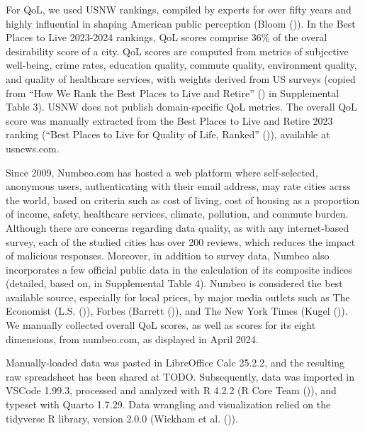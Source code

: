 \documentclass[
  english,
  12pt,
  a4paper,
]{scrartcl}
\begin{document}
For QoL, we used USNW rankings, compiled by experts for over fifty years
and highly influential in shaping American public perception (Bloom
()). In the Best Places to
Live 2023-2024 rankings, QoL scores comprise 36\% of the overal
desirability score of a city. QoL scores are computed from metrics of
subjective well-being, crime rates, education quality, commute quality,
environment quality, and quality of healthcare services, with weights
derived from US surveys (copied from {``How We Rank the {Best Places to
Live and Retire}''} () in Supplemental
Table 3). USNW does not publish domain-specific QoL metrics. The overall
QoL score was manually extracted from the Best Places to Live and Retire
2023 ranking ({``Best {Places to Live} for Quality of Life, Ranked''}
()), available at usnews.com.

Since 2009, Numbeo.com has hosted a web platform where self-selected,
anonymous users, authenticating with their email address, may rate
cities acrss the world, based on criteria such as cost of living, cost
of housing as a proportion of income, safety, healthcare services,
climate, pollution, and commute burden. Although there are concerns
regarding data quality, as with any internet-based survey, each of the
studied cities has over 200 reviews, which reduces the impact of
malicious responses. Moreover, in addition to survey data, Numbeo also
incorporates a few official public data in the calculation of its
composite indices (detailed, based on, in Supplemental Table 4). Numbeo
is considered the best available source, especially for local prices, by
major media outlets such as The Economist (L.S.
()), Forbes (Barrett
()), and The New
York Times (Kugel ()). We
manually collected overall QoL scores, as well as scores for its eight
dimensions, from numbeo.com, as displayed in April 2024.

Manually-loaded data was pasted in LibreOffice Calc 25.2.2, and the
resulting raw spreadsheet has been shared at TODO. Subsequently, data
was imported in VSCode 1.99.3, processed and analyzed with R 4.2.2 (R
Core Team
()), and
typeset with Quarto 1.7.29. Data wrangling and visualization relied on
the tidyverse R library, version 2.0.0 (Wickham et al.
()).
\end{document}
